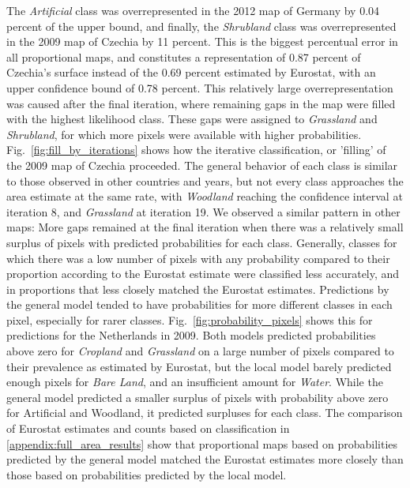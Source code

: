     The \textit{Artificial} class was overrepresented in the 2012 map of Germany by 0.04 percent of the upper bound, and finally, the \textit{Shrubland} class was overrepresented in the 2009 map of Czechia by 11 percent. This is the biggest percentual error in all proportional maps, and constitutes a representation of 0.87 percent of Czechia's surface instead of the 0.69 percent estimated by Eurostat, with an upper confidence bound of 0.78 percent. This relatively large overrepresentation was caused after the final iteration, where remaining gaps in the map were filled with the highest likelihood class. These gaps were assigned to \textit{Grassland} and \textit{Shrubland}, for which more pixels were available with higher probabilities. Fig.~\ref{fig:fill_by_iterations} shows how the iterative classification, or 'filling' of the 2009 map of Czechia proceeded. The general behavior of each class is similar to those observed in other countries and years, but not every class approaches the area estimate at the same rate, with \textit{Woodland} reaching the confidence interval at iteration 8, and \textit{Grassland} at iteration 19.
    We observed a similar pattern in other maps: More gaps remained at the final iteration when there was a relatively small surplus of pixels with predicted probabilities for each class. Generally, classes for which there was a low number of pixels with any probability compared to their proportion according to the Eurostat estimate were classified less accurately, and in proportions that less closely matched the Eurostat estimates.
    Predictions by the general model tended to have probabilities for more different classes in each pixel, especially for rarer classes. Fig.~\ref{fig:probability_pixels} shows this for predictions for the Netherlands in 2009. Both models predicted probabilities above zero for \textit{Cropland} and \textit{Grassland} on a large number of pixels compared to their prevalence as estimated by Eurostat, but the local model barely predicted enough pixels for \textit{Bare Land}, and an insufficient amount for \textit{Water}. While the general model predicted a smaller surplus of pixels with probability above zero for Artificial and Woodland, it predicted surpluses for each class. The comparison of Eurostat estimates and counts based on classification in \ref{appendix:full_area_results} show that proportional maps based on probabilities predicted by the general model matched the Eurostat estimates more closely than those based on probabilities predicted by the local model.
    
